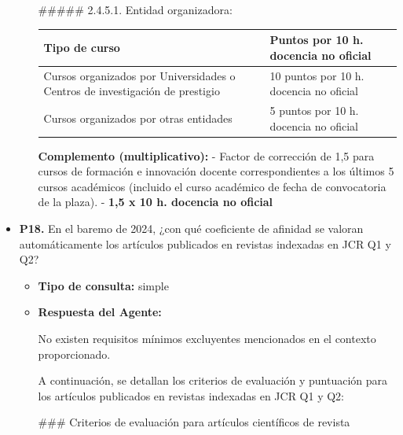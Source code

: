 \documentclass{article}
\begin{document}
\begin{itemize}
\begin{itemize}
\begin{scriptsize}
                  \#\#\#\#\# 2.4.5.1. Entidad organizadora:
                  \vspace{0.4cm}
                  \begin{table}[h!]\centering\renewcommand{\arraystretch}{1.3}
                    \begin{tabular}{|p{}|p{}|}\hline
                      Tipo de curso                                                                & Puntos por 10 h. docencia no oficial    \\\hline
                      Cursos organizados por Universidades o Centros de investigación de prestigio & 10 puntos por 10 h. docencia no oficial \\\hline
                      Cursos organizados por otras entidades                                       & 5 puntos por 10 h. docencia no oficial  \\\hline
                    \end{tabular}\end{table}
                  \vspace{0.4cm}

                  \textbf{Complemento (multiplicativo):}
                  - Factor de corrección de 1,5 para cursos de formación e innovación docente correspondientes a los últimos 5 cursos académicos (incluido el curso académico de fecha de convocatoria de la plaza).
                  - \textbf{1,5 x 10 h. docencia no oficial}
                \end{scriptsize}
        \end{itemize}


  \item \textbf{P18.} En el baremo de 2024, ¿con qué coeficiente de afinidad se valoran automáticamente los artículos publicados en revistas indexadas en JCR Q1 y Q2? \\
        \begin{itemize}
          \item \textbf{Tipo de consulta:} simple
          \item \textbf{Respuesta del Agente:}

                No existen requisitos mínimos excluyentes mencionados en el contexto proporcionado.

                A continuación, se detallan los criterios de evaluación y puntuación para los artículos publicados en revistas indexadas en JCR Q1 y Q2:

                \#\#\# Criterios de evaluación para artículos científicos de revista


\end{itemize}
\end{itemize}
\end{document}
